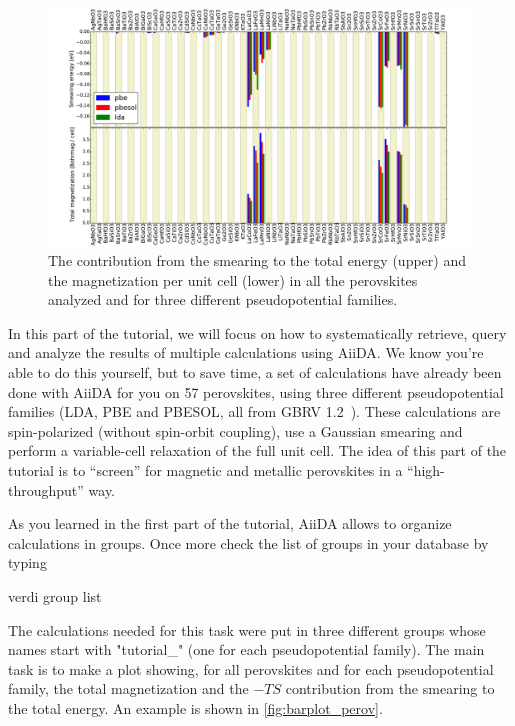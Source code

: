 \begin{figure}[!b]
 \includegraphics[width=\linewidth]{img/magnetization_smearing_perovskites.pdf}
 \caption{The contribution from the smearing to the total energy (upper) and the magnetization per unit cell (lower)
 in all the perovskites analyzed and for three different pseudopotential families.}
 \label{fig:barplot_perov}
\end{figure}
%
In this part of the tutorial, we will focus on how to systematically retrieve, query and analyze the results of multiple calculations using AiiDA.
We know you're able to do this yourself, but to save time, a set of calculations have already been done with AiiDA for you on 57 perovskites,
using three different pseudopotential families (LDA, PBE and PBESOL, all from GBRV 1.2~\cite{ref:GBRV}).
These calculations are spin-polarized (without spin-orbit coupling),
use a Gaussian smearing and perform a variable-cell relaxation of the full unit cell.
The idea of this part of the tutorial is to ``screen'' for magnetic and metallic perovskites in a ``high-throughput'' way.

As you learned in the first part of the tutorial, AiiDA allows to organize calculations in groups.
Once more check the list of groups in your database by typing

\begin{bashcommand}
 verdi group list
\end{bashcommand}

The calculations needed for this task were put in three different groups whose names start with "tutorial\_" (one for each pseudopotential family).
The main task is to make a plot showing, for all perovskites and for each pseudopotential family,
the total magnetization and the $-TS$ contribution from the smearing to the total energy.
An example is shown in \autoref{fig:barplot_perov}.


